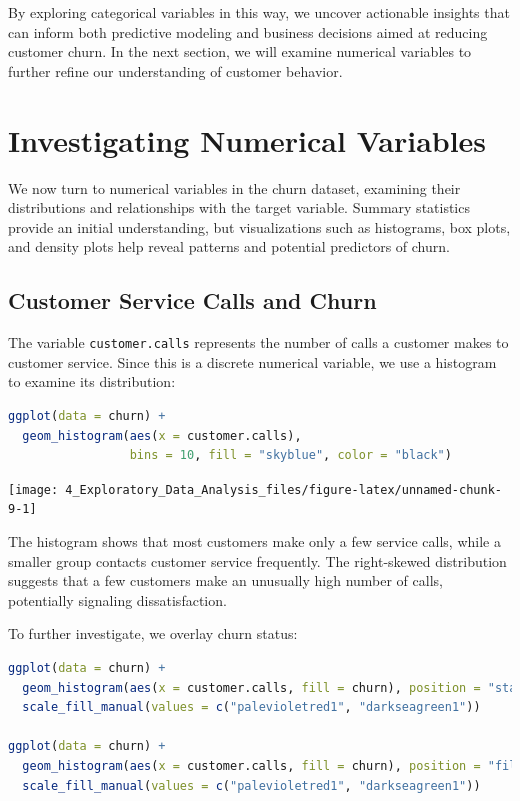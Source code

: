 \documentclass[
  11pt,
]{book}
\newcommand{\passthrough}[1]{#1}
\theoremstyle{definition}
\theoremstyle{definition}
\theoremstyle{definition}
\theoremstyle{definition}
\theoremstyle{remark}
\begin{document}
By exploring categorical variables in this way, we uncover actionable insights that can inform both predictive modeling and business decisions aimed at reducing customer churn. In the next section, we will examine numerical variables to further refine our understanding of customer behavior.

\section{Investigating Numerical Variables}\label{EDA-sec-numeric}

We now turn to numerical variables in the churn dataset, examining their distributions and relationships with the target variable. Summary statistics provide an initial understanding, but visualizations such as histograms, box plots, and density plots help reveal patterns and potential predictors of churn.

\subsection*{Customer Service Calls and Churn}\label{customer-service-calls-and-churn}


The variable \passthrough{\lstinline!customer.calls!} represents the number of calls a customer makes to customer service. Since this is a discrete numerical variable, we use a histogram to examine its distribution:

\begin{lstlisting}[language=R]
ggplot(data = churn) +
  geom_histogram(aes(x = customer.calls), 
                 bins = 10, fill = "skyblue", color = "black")
\end{lstlisting}

\begin{center}\texttt{[image: 4\_Exploratory\_Data\_Analysis\_files/figure-latex/unnamed-chunk-9-1]} \end{center}

The histogram shows that most customers make only a few service calls, while a smaller group contacts customer service frequently. The right-skewed distribution suggests that a few customers make an unusually high number of calls, potentially signaling dissatisfaction.

To further investigate, we overlay churn status:

\begin{lstlisting}[language=R]
ggplot(data = churn) +
  geom_histogram(aes(x = customer.calls, fill = churn), position = "stack") +
  scale_fill_manual(values = c("palevioletred1", "darkseagreen1")) 
  
ggplot(data = churn) +
  geom_histogram(aes(x = customer.calls, fill = churn), position = "fill") +
  scale_fill_manual(values = c("palevioletred1", "darkseagreen1")) 
\end{lstlisting}
\end{document}
